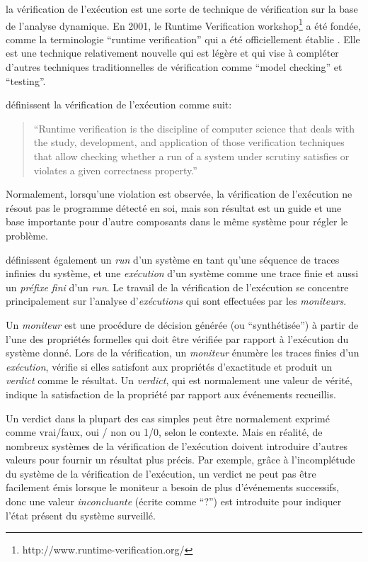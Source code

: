 la vérification de l'exécution est une sorte de technique de vérification sur la base de l'analyse dynamique. En 2001, le Runtime Verification workshop\footnote{http://www.runtime-verification.org/} a été fondée, comme la terminologie ``runtime verification'' qui a été officiellement établie \citep{wiki:rv}. Elle est une technique relativement nouvelle qui est légère et qui vise à compléter d'autres techniques traditionnelles de vérification comme ``model checking'' et ``testing''.

\cite{leucker2009brief} définissent la vérification de l'exécution comme suit:

\begin{quote}
``Runtime verification is the discipline of computer science that deals with the study, development, and application of those verification techniques that allow checking whether a run of a system under scrutiny satisfies or violates a given correctness property.''
\end{quote}

Normalement, lorsqu'une violation est observée, la vérification de l'exécution ne résout pas le programme détecté en soi, mais son résultat est un guide et une base importante pour d'autre composants dans le même système pour régler le problème.

\cite{leucker2009brief} définissent également un \emph{run} d'un système en tant qu'une séquence de traces infinies du système, et une \emph{exécution} d'un système comme une trace finie et aussi un \emph{préfixe fini} d'un \emph{run}. Le travail de la vérification de l'exécution se concentre principalement sur l'analyse d'\emph{exécutions} qui sont effectuées par les \emph{moniteurs}.

Un \emph{moniteur} est une procédure de décision générée (ou ``synthétisée'') à partir de l'une des propriétés formelles qui doit être vérifiée par rapport à l'exécution du système donné. Lors de la vérification, un \emph{moniteur} énumère les traces finies d'un \emph{exécution}, vérifie si elles satisfont aux propriétés d'exactitude et produit un \emph{verdict} comme le résultat. Un \emph{verdict}, qui est normalement une valeur de vérité, indique la satisfaction de la propriété par rapport aux événements recueillis.

Un verdict dans la plupart des cas simples peut être normalement exprimé comme vrai/faux, oui / non ou 1/0, selon le contexte. Mais en réalité, de nombreux systèmes de la vérification de l'exécution doivent introduire d'autres valeurs pour fournir un résultat plus précis. Par exemple, grâce à l'incomplétude du système de la vérification de l'exécution, un verdict ne peut pas être facilement émis lorsque le moniteur a besoin de plus d'événements successifs, donc une valeur \emph{inconcluante} (écrite comme ``?'') est introduite pour indiquer l'état présent du système surveillé. \citep{falcone2013tutorial}

